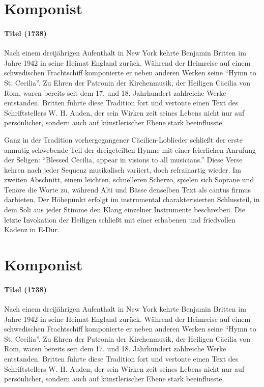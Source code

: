 \documentclass[11pt, ngermanm, titlepage]{article}
\begin{document}
	\begin{multicols}{2}
	\section*{Komponist}
	\paragraph{Titel (1738)\newline}
	Nach einem dreijährigen Aufenthalt in New York kehrte Benjamin Britten im Jahre 1942 in seine Heimat England zurück. Während der Heimreise auf einem schwedischen Frachtschiff komponierte er neben anderen Werken seine "`Hymn to St. Cecilia"'. Zu Ehren der Patronin der Kirchenmusik, der Heiligen Cäcilia von Rom, waren bereits seit dem 17. und 18. Jahrhundert zahlreiche Werke entstanden. Britten führte diese Tradition fort und vertonte einen Text des Schriftstellers W. H. Auden, der sein Wirken zeit seines Lebens nicht nur auf persönlicher, sondern auch auf künstlerischer Ebene stark beeinflusste. 

	Ganz in der Tradition vorhergegangener Cäcilien-Loblieder schließt der erste anmutig schwebende Teil der dreigeteilten Hymne mit einer feierlichen Anrufung der Seligen: "`Blessed Cecilia, appear in visions to all musicians."' Diese Verse kehren nach jeder Sequenz musikalisch variiert, doch refrainartig wieder. Im zweiten Abschnitt, einem leichten, schnelleren Scherzo, spielen sich Soprane und Tenöre die Worte zu, während Alti und Bässe denselben Text als cantus firmus darbieten. Der Höhepunkt erfolgt im instrumental charakterisierten Schlussteil, in dem Soli aus jeder Stimme den Klang einzelner Instrumente beschreiben. Die letzte Invokation der Heiligen schließt mit einer erhabenen und friedvollen Kadenz in E-Dur. 
	
	\section*{Komponist}
	\paragraph{Titel (1738)\newline}
	Nach einem dreijährigen Aufenthalt in New York kehrte Benjamin Britten im Jahre 1942 in seine Heimat England zurück. Während der Heimreise auf einem schwedischen Frachtschiff komponierte er neben anderen Werken seine "`Hymn to St. Cecilia"'. Zu Ehren der Patronin der Kirchenmusik, der Heiligen Cäcilia von Rom, waren bereits seit dem 17. und 18. Jahrhundert zahlreiche Werke entstanden. Britten führte diese Tradition fort und vertonte einen Text des Schriftstellers W. H. Auden, der sein Wirken zeit seines Lebens nicht nur auf persönlicher, sondern auch auf künstlerischer Ebene stark beeinflusste. 
	

\end{multicols}
\end{document}
